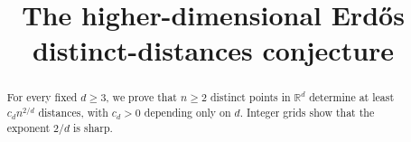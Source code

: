 \documentclass[11pt,a4paper]{amsart}
\title{The higher-dimensional Erd\H{o}s distinct-distances conjecture}
\author{}
\date{}
\begin{document}
\begin{abstract}
For every fixed $d\geq3$, we prove that $n\geq2$ distinct points in $\mathbb{R}^d$ determine at least $c_d n^{2/d}$ distances, with $c_d>0$ depending only on $d$. Integer grids show that the exponent $2/d$ is sharp.
\end{abstract}

\maketitle


\FloatBarrier
\tableofcontents






\appendix



\printbibliography
\end{document}
